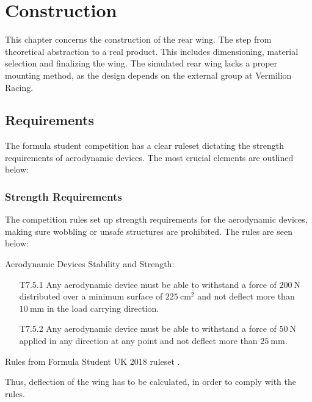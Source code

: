 \chapter{Construction}

  This chapter concerns the construction of the rear wing. The step from theoretical abstraction to a real product. This includes dimensioning, material selection and finalizing the wing. The simulated rear wing lacks a proper mounting method, as the design depends on the external group at Vermilion Racing.

\section{Requirements}

  The formula student competition has a clear ruleset dictating the strength requirements of aerodynamic devices. The most crucial elements are outlined below:

  \subsection{Strength Requirements}

    The competition rules set up strength requirements for the aerodynamic devices, making sure wobbling or unsafe structures are prohibited. The rules are seen below:

    \begin{tcolorbox}[colframe=seapurple,colback=seapurple!1]
      Aerodynamic Devices Stability and Strength:
      \begin{itemize}
        \item [T7.5.1] Any aerodynamic device must be able to withstand a force of $\SI{200}{\newton}$ distributed over a minimum surface of $\SI{225}{\centi\metre\squared}$ and not deflect more than $\SI{10}{\milli\metre}$ in the load carrying direction.
        \item [T7.5.2] Any aerodynamic device must be able to withstand a force of $\SI{50}{\newton}$ applied in any direction at any point and not deflect more than $\SI{25}{\milli\metre}$.
      \end{itemize}
      \vspace{5pt}
      \hspace*{\fill}\tiny{Rules from Formula Student UK 2018 ruleset \cite{FSrules18}.}
    \end{tcolorbox}

    Thus, deflection of the wing has to be calculated, in order to comply with the rules.

